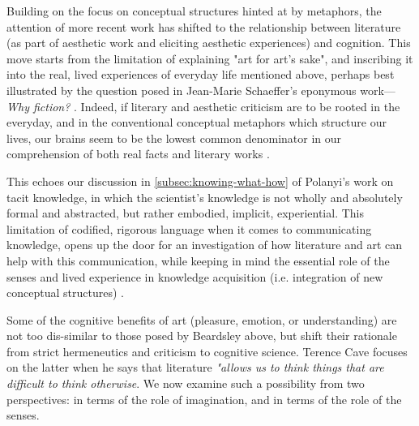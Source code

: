 Building on the focus on conceptual structures hinted at by metaphors, the attention of more recent work has shifted to the relationship between literature (as part of aesthetic work and eliciting aesthetic experiences) and cognition. This move starts from the limitation of explaining "art for art's sake", and inscribing it into the real, lived experiences of everyday life mentioned above, perhaps best illustrated by the question posed in Jean-Marie Schaeffer's eponymous work—\emph{Why fiction?} \citep{schaeffer_pourquoi_1999}. Indeed, if literary and aesthetic criticism are to be rooted in the everyday, and in the conventional conceptual metaphors which structure our lives, our brains seem to be the lowest common denominator in our comprehension of both real facts and literary works \citep{lavocat_interpretation_2015}.

This echoes our discussion in \ref{subsec:knowing-what-how} of Polanyi's work on tacit knowledge, in which the scientist's knowledge is not wholly and absolutely formal and abstracted, but rather embodied, implicit, experiential. This limitation of codified, rigorous language when it comes to communicating knowledge, opens up the door for an investigation of how literature and art can help with this communication, while keeping in mind the essential role of the senses and lived experience in knowledge acquisition (i.e. integration of new conceptual structures) \citep{polanyi_tacit_2009}.

Some of the cognitive benefits of art (pleasure, emotion, or understanding) are not too dis-similar to those posed by Beardsley above, but shift their rationale from strict hermeneutics and criticism to cognitive science. Terence Cave focuses on the latter when he says that literature \emph{"allows us to think things that are difficult to think otherwise}. We now examine such a possibility from two perspectives: in terms of the role of imagination, and in terms of the role of the senses.

